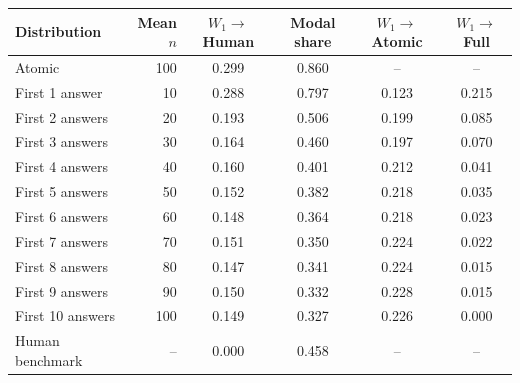\normalsize
\setlength{\tabcolsep}{3pt}
\begin{tabular}{lrcccc}
\toprule
Distribution & Mean $n$ & $W_1\!\to$ Human & Modal share & $W_1\!\to$ Atomic & $W_1\!\to$ Full \\
\midrule
Atomic & 100 & 0.299 & 0.860 & -- & -- \\
First 1 answer & 10 & 0.288 & 0.797 & 0.123 & 0.215 \\
First 2 answers & 20 & 0.193 & 0.506 & 0.199 & 0.085 \\
First 3 answers & 30 & 0.164 & 0.460 & 0.197 & 0.070 \\
First 4 answers & 40 & 0.160 & 0.401 & 0.212 & 0.041 \\
First 5 answers & 50 & 0.152 & 0.382 & 0.218 & 0.035 \\
First 6 answers & 60 & 0.148 & 0.364 & 0.218 & 0.023 \\
First 7 answers & 70 & 0.151 & 0.350 & 0.224 & 0.022 \\
First 8 answers & 80 & 0.147 & 0.341 & 0.224 & 0.015 \\
First 9 answers & 90 & 0.150 & 0.332 & 0.228 & 0.015 \\
First 10 answers & 100 & 0.149 & 0.327 & 0.226 & 0.000 \\
Human benchmark & -- & 0.000 & 0.458 & -- & -- \\
\bottomrule
\end{tabular}
